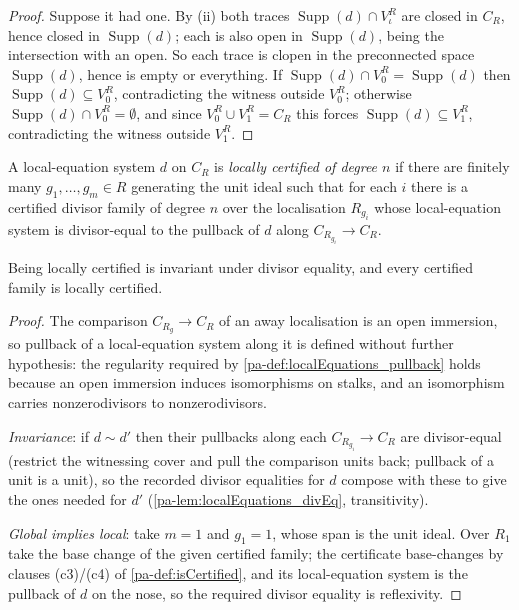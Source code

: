 \begin{proof}
  Suppose it had one. By (ii) both traces \(\operatorname{Supp}(d) \cap V_\iota^R\) are
  closed in \(C_R\), hence closed in \(\operatorname{Supp}(d)\); each is also open in
  \(\operatorname{Supp}(d)\), being the intersection with an open. So each trace is clopen
  in the preconnected space \(\operatorname{Supp}(d)\), hence is empty or everything. If
  \(\operatorname{Supp}(d) \cap V_0^R = \operatorname{Supp}(d)\) then
  \(\operatorname{Supp}(d) \subseteq V_0^R\), contradicting the witness outside \(V_0^R\);
  otherwise \(\operatorname{Supp}(d) \cap V_0^R = \emptyset\), and since
  \(V_0^R \cup V_1^R = C_R\) this forces \(\operatorname{Supp}(d) \subseteq V_1^R\),
  contradicting the witness outside \(V_1^R\).
\end{proof}

\begin{definition}
  \label{pa-def:isLocallyCertified}
  \leanok

  A local-equation system \(d\) on \(C_R\) is \emph{locally certified of degree \(n\)} if
  there are finitely many \(g_1, \dots, g_m \in R\) generating the unit ideal such that for
  each \(i\) there is a certified divisor family of degree \(n\) over the localisation
  \(R_{g_i}\) whose local-equation system is divisor-equal to the pullback of \(d\) along
  \(C_{R_{g_i}} \to C_R\).

  Being locally certified is invariant under divisor equality, and every certified family
  is locally certified.
\end{definition}
\begin{proof}
  \leanok
  The comparison \(C_{R_{g}} \to C_R\) of an away localisation is an open immersion, so
  pullback of a local-equation system along it is defined without further hypothesis: the
  regularity required by \ref{pa-def:localEquations_pullback} holds because an open immersion
  induces isomorphisms on stalks, and an isomorphism carries nonzerodivisors to
  nonzerodivisors.

  \emph{Invariance}: if \(d \sim d'\) then their pullbacks along each \(C_{R_{g_i}} \to
  C_R\) are divisor-equal (restrict the witnessing cover and pull the comparison units
  back; pullback of a unit is a unit), so the recorded divisor equalities for \(d\) compose
  with these to give the ones needed for \(d'\) (\ref{pa-lem:localEquations_divEq},
  transitivity).

  \emph{Global implies local}: take \(m = 1\) and \(g_1 = 1\), whose span is the unit
  ideal. Over \(R_1\) take the base change of the given certified family; the certificate
  base-changes by clauses (c3)/(c4) of \ref{pa-def:isCertified}, and its local-equation system
  is the pullback of \(d\) on the nose, so the required divisor equality is reflexivity.
\end{proof}

